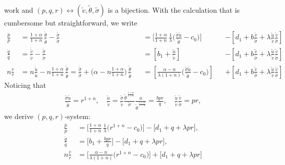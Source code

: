 \documentclass[a4paper,11pt]{article}
\def\tv{{\tilde{v}}}
\def\tth{{\tilde{\theta}}}
\def\ts{{\tilde{\sigma}}}
\def\tu{{\tilde{u}}}
\def\dtv{{\dot{\tilde{v}}}}
\def\dtth{{\dot{\tilde{\theta}}}}
\def\dts{{\dot{\tilde{\sigma}}}}
\def\dtu{{\dot{\tilde{u}}}}
\def\dpp{\dot{p}}
\def\dqq{\dot{q}}
\def\drr{\dot{r}}
\begin{document}
 work and $(p,q,r) \leftrightarrow (\tv, \tth,\ts)$ is a bijection.
With the calculation that is cumbersome but straightforward, we write
\begin{align*}
 \frac{\dpp}{p}&=\frac{1+\alpha}{1+n}\,\frac{\dtth}{\tth} - \frac{\dts}{\ts}& &=\Big[\frac{1+\alpha}{1+n}\,\frac{1}{\lambda }\Big(\frac{\ts\tu}{\tth}-c_0\Big)\Big] & &-\left[d_1 + b\frac{\tv}{\ts} + \lambda\frac{\tu}{\tv}\frac{\tv}{\ts}\right]\\
 \frac{\dqq}{q}&=\frac{\dtv}{\tv} - \frac{\dts}{\ts}& &=\left[b_1 +\frac{\tu}{\tv}\right] & &-\left[d_1 + b\frac{\tv}{\ts} + \lambda\frac{\tu}{\tv}\frac{\tv}{\ts}\right]\\
 n\frac{\drr}{r}&=n\frac{\dtu}{\tu} -n\frac{1+\alpha}{1+n}\,\frac{\dtth}{\tth}= \frac{\dts}{\ts} + \Big(\alpha-n\frac{1+\alpha}{1+n}\Big)\,\frac{\dtth}{\tth} & &=\left[\frac{\alpha-n}{\lambda(1+n)}\Big(\frac{\ts\tu}{\tth}-c_0\Big)\right]& &+\left[d_1 + b\frac{\tv}{\ts} + \lambda\frac{\tu}{\tv}\frac{\tv}{\ts}\right]
\end{align*}
Noticing that
\begin{align*}
 \frac{\ts\tu}{\tth} = r^{1+n}, \quad \frac{\tu}{\tv} = \frac{\ts}{\tv} \frac{\tth^{\,\frac{1+\alpha}{1+n}}}{\ts} \frac{u}{\tth^{\,\frac{1+\alpha}{1+n}}} = \frac{bpr}{q}, \quad \frac{\tu}{\tv} \frac{\tv}{\ts} = pr,
\end{align*}
we derive $(p,q,r)$-system:
\begin{equation} \label{eq:pqrsys}
\begin{aligned}
 \frac{\dpp}{p}&=\Big[\frac{1+\alpha}{1+n}\,\frac{1}{\lambda }\Big(r^{1+n}-c_0\Big)\Big] -\Big[d_1 + q + \lambda pr\Big],\\
 \frac{\dqq}{q}&=\Big[b_1 +\frac{bpr}{q}\Big] -\Big[d_1 + q + \lambda pr\Big],\\
 n\frac{\drr}{r}&=\Big[\frac{\alpha-n}{\lambda(1+n)}\Big(r^{1+n}-c_0\Big)\Big]+\Big[d_1 + q + \lambda pr\Big]
\end{aligned}
\end{equation}
\end{document}
